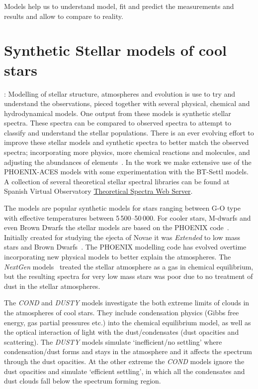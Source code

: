 
Models help us to understand model, fit and predict the measurements and results and allow to compare to reality.

\section{Synthetic Stellar models of cool stars}:
Modelling of stellar structure, atmospheres and evolution is use to try and understand the observations, pieced together with several physical, chemical and hydrodynamical models.
One output from these models is synthetic stellar spectra.
These spectra can be compared to observed spectra to attempt to classify and understand the stellar populations.
There is an ever evolving effort to improve these stellar models and synthetic spectra to better match the observed spectra; incorporating more physics, more chemical reactions and molecules, and adjusting the abundances of elements~\citep[e.g.]{husser_new_2013, caffau_solar_2011}.
In the work we make extensive use of the {PHOENIX-ACES} models with some experimentation with the {BT-Settl} models.
A collection of several theoretical stellar spectral libraries can be found at Spanish Virtual Observatory \href{http://svo2.cab.inta-csic.es/theory/newov/index.php}{Theoretical Spectra Web Server}.

The \citet{kurucz_model_1979} models are popular synthetic models for stars ranging between G-O type with effective temperatures between 5\,500--50\,000\K.
For cooler stars, M-dwarfs and even Brown Dwarfs the stellar models are based on the {PHOENIX} code~\citep[e.g.][]{hauschildt_parallel_1997}.
Initially created for studying the ejecta of Novae it was \emph{Extended} to low mass stars and Brown Dwarfs~\citep{allard_model_1995}.
The PHOENIX modelling code has evolved overtime incorporating new physical models to better explain the atmospheres.
The \emph{NextGen} models~\citep{hauschildt_nextgen_1999b} treated the stellar atmosphere as a gas in chemical equilibrium, but the resulting spectra for very low mass stars was poor due to no treatment of dust in the stellar atmospheres.

The \citep{allard_limiting_2001} \emph{COND} and \emph{DUSTY} models investigate the both extreme limits of clouds in the atmospheres of cool stars.
They include condensation physics (Gibbs free energy, gas partial pressures etc.) into the chemical equilibrium model, as well as the optical interaction of light with the dust/condensates (dust opacities and scattering).
The \emph{DUSTY} models simulate `inefficient/no settling' where condensation/dust forms and stays in the atmosphere and it affects the spectrum through the dust opacities.
At the other extreme the \emph{COND} models ignore the dust opacities and simulate `efficient settling', in which all the condensates and dust clouds fall below the spectrum forming region.

